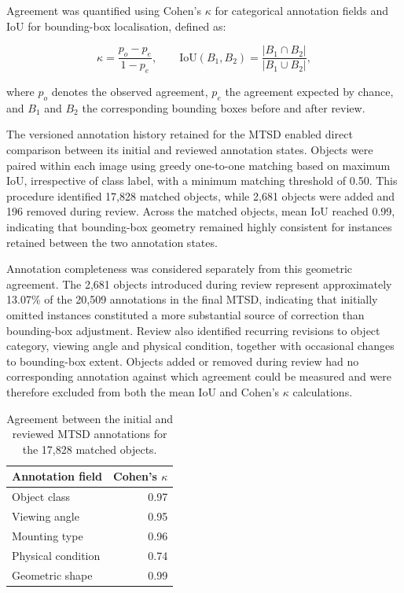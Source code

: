 \noindent Agreement was quantified using Cohen's \(\kappa\) \cite{cohen1960coefficient} for categorical annotation fields and \gls{IoU} for bounding-box localisation, defined as:

\begin{equation}
\label{eq:kappa-iou}
\kappa = \frac{p_o-p_e}{1-p_e}, \qquad
\mathrm{IoU}(B_1,B_2) = \frac{|B_1\cap B_2|}{|B_1\cup B_2|},
\end{equation}

\noindent where \(p_o\) denotes the observed agreement, \(p_e\) the agreement expected by chance, and \(B_1\) and \(B_2\) the corresponding bounding boxes before and after review.

The versioned annotation history retained for the \gls{MTSD} enabled direct comparison between its initial and reviewed annotation states. Objects were paired within each image using greedy one-to-one matching based on maximum \gls{IoU}, irrespective of class label, with a minimum matching threshold of 0.50. This procedure identified 17,828 matched objects, while 2,681 objects were added and 196 removed during review. Across the matched objects, mean \gls{IoU} reached 0.99, indicating that bounding-box geometry remained highly consistent for instances retained between the two annotation states.

\newpage
\noindent Annotation completeness was considered separately from this geometric agreement. The 2,681 objects introduced during review represent approximately 13.07\% of the 20,509 annotations in the final \gls{MTSD}, indicating that initially omitted instances constituted a more substantial source of correction than bounding-box adjustment. Review also identified recurring revisions to object category, viewing angle and physical condition, together with occasional changes to bounding-box extent. Objects added or removed during review had no corresponding annotation against which agreement could be measured and were therefore excluded from both the mean \gls{IoU} and Cohen's \(\kappa\) calculations.

\begin{table}[h]
\centering
\caption{Agreement between the initial and reviewed \gls{MTSD} annotations for the 17,828 matched objects.}
\label{tab:mtsd-annotation-agreement}
\begin{tabular}{@{}lr@{}}
\toprule
    \textbf{Annotation field} & \textbf{Cohen's $\kappa$} \\
    \midrule
    Object class & 0.97 \\
    Viewing angle & 0.95 \\
    Mounting type & 0.96 \\
    Physical condition & 0.74 \\
    Geometric shape & 0.99 \\
\bottomrule
\end{tabular}
\end{table}

